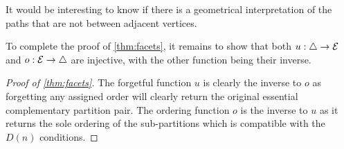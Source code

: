 \begin{rem}
    It would be interesting to know if there is a geometrical interpretation of the paths that are not between adjacent vertices. 
\end{rem}

To complete the proof of \cref{thm:facets}, it remains to show that both $u:\triangle \to \mathcal{E}$ and $o:\mathcal{E}\to \triangle$ are injective, with the other function being their inverse.

\begin{proof}[{Proof of \cref{thm:facets}}]
The forgetful function $u$ is clearly the inverse to $o$ as forgetting any assigned order will clearly return the original essential complementary partition pair. 
The ordering function $o$ is the inverse to $u$ as it returns the sole ordering of the sub-partitions which is compatible with the $D(n)$ conditions.
\end{proof}


